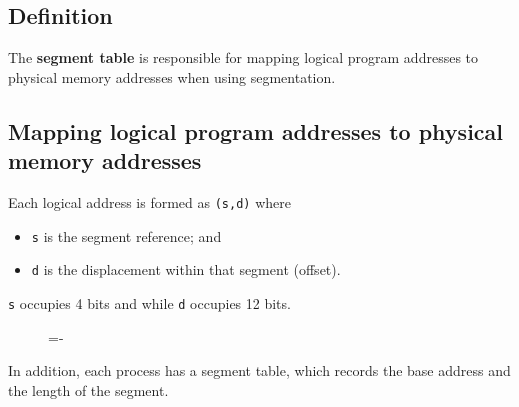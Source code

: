 \documentclass[a4paper]{systems-software}
\begin{document}
\subsection*{Definition}

The \textbf{segment table} is responsible for mapping logical program addresses to physical memory addresses when using segmentation.


\subsection*{Mapping logical program addresses to physical memory addresses}

Each logical address is formed as \texttt{(s,d)} where
\begin{itemize}
	\item \texttt{s} is the segment reference; and
	\item \texttt{d} is the displacement within that segment (offset).
\end{itemize}
\texttt{s} occupies 4 bits and while \texttt{d} occupies 12 bits.

\begin{figure}[H]
  \lineskip=-\fboxrule
\end{figure}

In addition, each process has a segment table, which records the base address and the length of the segment.
\end{document}
